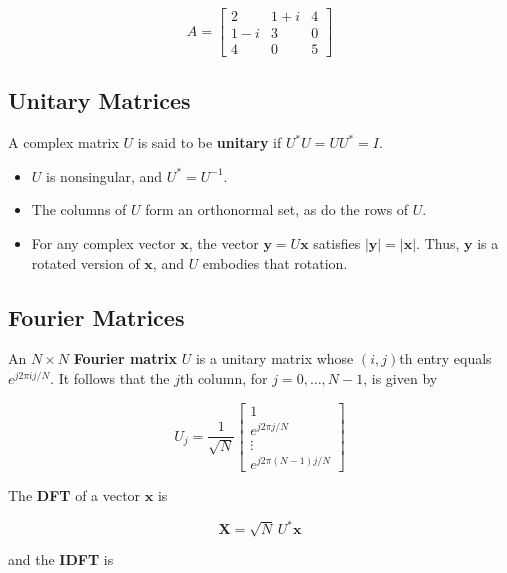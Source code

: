\begin{equation*}
A =
\begin{bmatrix}
2 & 1+i & 4 \\
1-i & 3 & 0 \\
4 & 0 & 5
\end{bmatrix}
\end{equation*}

\subsection{Unitary Matrices}

A complex matrix $U$ is said to be \textbf{unitary} if $U^* U = U U^* = I$.

\begin{itemize}
    \item $U$ is nonsingular, and $U^* = U^{-1}$.  
    \item The columns of $U$ form an orthonormal set, as do the rows of $U$.  
    \item For any complex vector $\mathbf{x}$, the vector $\mathbf{y} = U \mathbf{x}$ satisfies $|\mathbf{y}| = |\mathbf{x}|$.  
    Thus, $\mathbf{y}$ is a rotated version of $\mathbf{x}$, and $U$ embodies that rotation.
\end{itemize}

\subsection{Fourier Matrices}

An $N \times N$ \textbf{Fourier matrix} $U$ is a unitary matrix whose $(i,j)$th entry equals $e^{j 2\pi i j / N}$.  
It follows that the $j$th column, for $j = 0, \ldots, N-1$, is given by

\begin{equation}
U_j = \frac{1}{\sqrt{N}}
\begin{bmatrix}
1 \\
e^{j 2\pi j / N} \\
\vdots \\
e^{j 2\pi (N-1) j / N}
\end{bmatrix}
\tag{B.7}
\end{equation}

The \textbf{DFT} of a vector $\mathbf{x}$ is

\begin{equation}
\mathbf{X} = \sqrt{N} \, U^* \mathbf{x}
\tag{B.8}
\end{equation}

and the \textbf{IDFT} is

